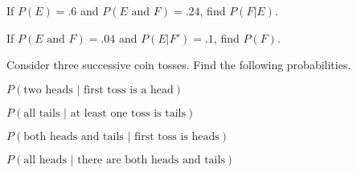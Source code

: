 \begin{puzzle}
    If \( P(E) = .6 \) and \( P(E \text{ and } F) = .24 \), find \( P(F | E) \).
\end{puzzle}

\begin{puzzle}
    If \( P(E \text{ and } F) = .04 \) and \( P(E | F') = .1 \), find \( P(F) \).
\end{puzzle}



Consider three successive coin tosses. Find the following probabilities.

\begin{puzzle}
    \( P(\text{two heads } | \text{ first toss is a head})\)
\end{puzzle}

\begin{puzzle}
    \( P(\text{all tails } | \text{ at least one toss is tails})\)
\end{puzzle}

\begin{puzzle}
    \( P(\text{both heads and tails } | \text{ first toss is heads})\)
\end{puzzle}

\begin{puzzle}
    \( P(\text{all heads } | \text{ there are both heads and tails})\)
\end{puzzle}